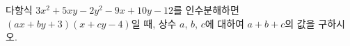 다항식 $3x^2+5xy-2y^2-9x+10y-12$를 인수분해하면 $(ax+by+3)(x+cy-4)$일 때, 상수 $a$, $b$, $c$에 대하여 $a+b+c$의 값을 구하시오.
